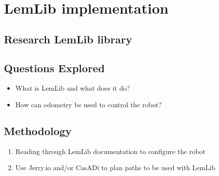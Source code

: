 \section{LemLib implementation}

\subsection{Research LemLib library}

\subsection{Questions Explored}
\begin{itemize}
    \item What is LemLib and what does it do?
    \item How can odometry be used to control the robot?
\end{itemize}

\subsection{Methodology}
\begin{enumerate}
    \item Reading through LemLib documentation to configure the robot
    \item Use Jerry.io and/or CasADi to plan paths to be used with LemLib
\end{enumerate}


